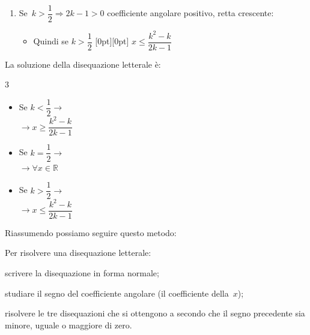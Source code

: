 \begin{enumerate}
\item Se~\(k > \dfrac{1}{2} \Rightarrow 2 k - 1 > 0\)
coefficiente angolare positivo, retta crescente:

\vspace{-.5em} \hspace*{-5mm} 

\vspace{-1.5em}
\begin{itemize} [nosep]
\item 
Quindi se \quad \(k > \dfrac{1}{2}\) \qquad 
\raisebox{-9pt}[0pt][0pt]{
}
\qquad \(x \leqslant\dfrac{k^2 - k}{2 k - 1}\)
\end{itemize}

\end{enumerate}

La soluzione della disequazione letterale è:

\begin{htmulticols}{3}
\begin{itemize} [noitemsep]
\item 
Se \(k < \dfrac{1}{2} \rightarrow\)\\
\(\rightarrow x \geqslant \dfrac{k^2 - k}{2 k - 1}\)
\item Se \(k = \dfrac{1}{2} \rightarrow\)\\[3mm]
\(\rightarrow \forall x \in \mathbb{R}\)
\item 
Se \(k > \dfrac{1}{2} \rightarrow\)\\
\(\rightarrow x \leqslant\dfrac{k^2 - k}{2 k - 1}\)
\end{itemize}
\end{htmulticols}

Riassumendo possiamo seguire questo metodo:

\begin{procedura}{}{}
 Per risolvere una disequazione letterale:
\begin{enumeratea}
 \item scrivere la disequazione in forma normale;
 \item studiare il segno del coefficiente angolare (il coefficiente 
della~\(x\));
 \item risolvere le tre disequazioni che si ottengono a secondo che il segno 
  precedente sia minore, uguale o maggiore di zero.
\end{enumeratea}
\end{procedura}


